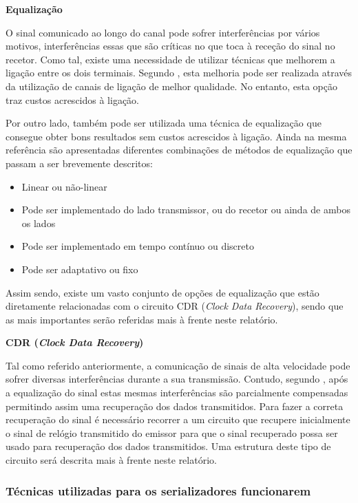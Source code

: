  \textbf{Equalização}
	
	\hspace{1.0em}O sinal comunicado ao longo do canal pode sofrer interferências por vários motivos, interferências essas que são críticas no que toca à receção do sinal no recetor. Como tal, existe uma necessidade de utilizar técnicas que melhorem a ligação entre os dois terminais. Segundo \cite{R012}, esta melhoria pode ser realizada através da utilização de canais de ligação de melhor qualidade. No entanto, esta opção traz custos acrescidos à ligação. 
	
	\hspace{1.0em}Por outro lado, também pode ser utilizada uma técnica de equalização que consegue obter bons resultados sem custos acrescidos à ligação. Ainda na mesma referência são apresentadas diferentes combinações de métodos de equalização que passam a ser brevemente descritos:
	
	\begin{itemize}
		\item Linear ou não-linear
		\item Pode ser implementado do lado transmissor, ou do recetor ou ainda de ambos os lados
		\item Pode ser implementado em tempo contínuo ou discreto
		\item Pode ser adaptativo ou fixo
	\end{itemize}

	Assim sendo, existe um vasto conjunto de opções de equalização que estão diretamente relacionadas com o circuito CDR (\textit{Clock Data Recovery}), sendo que as mais importantes serão referidas mais à frente neste relatório. 

 \textbf{CDR (\textit{Clock Data Recovery})}
	
	\hspace{1.0em}Tal como referido anteriormente, a comunicação de sinais de alta velocidade pode sofrer diversas interferências durante a sua transmissão. Contudo, segundo \cite{R012}, após a equalização do sinal estas mesmas interferências são parcialmente compensadas permitindo assim uma recuperação dos dados transmitidos.  Para fazer a correta recuperação do sinal é necessário recorrer a um circuito que recupere inicialmente o sinal de relógio transmitido do emissor para que o sinal recuperado possa ser usado para recuperação dos dados transmitidos. Uma estrutura deste tipo de circuito será descrita mais à frente neste relatório.


\subsubsection*{Técnicas utilizadas para os serializadores funcionarem}


